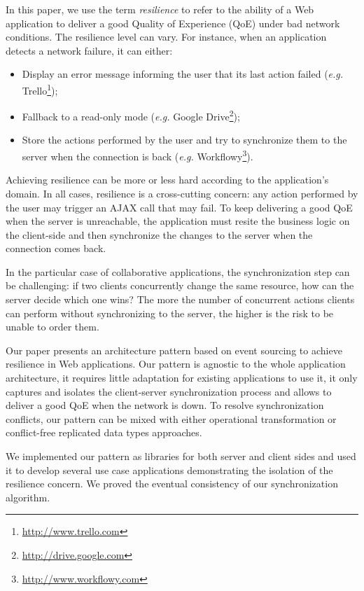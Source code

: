 \documentclass{acm_proc_article-sp}
\begin{document}
In this paper, we use the term \textit{resilience} to refer to the ability of a Web application to deliver a good Quality of Experience (QoE) under bad network conditions. The resilience level can vary. For instance, when an application detects a network failure, it can either:

\begin{itemize}
 \item Display an error message informing the user that its last action failed (\textit{e.g.} Trello\footnote{\href{http://www.trello.com}{http://www.trello.com}});
 \item Fallback to a read-only mode (\textit{e.g.} Google Drive\footnote{\href{http://drive.google.com}{http://drive.google.com}});
 \item Store the actions performed by the user and try to synchronize them to the server when the connection is back (\textit{e.g.} Workflowy\footnote{\href{http://www.workflowy.com}{http://www.workflowy.com}}).
\end{itemize}

Achieving resilience can be more or less hard according to the application’s domain. In all cases, resilience is a cross-cutting concern: any action performed by the user may trigger an AJAX call that may fail. To keep delivering a good QoE when the server is unreachable, the application must resite the business logic on the client-side and then synchronize the changes to the server when the connection comes back.

In the particular case of collaborative applications, the synchronization step can be challenging: if two clients concurrently change the same resource, how can the server decide which one wins? The more the number of concurrent actions clients can perform without synchronizing to the server, the higher is the risk to be unable to order them.

Our paper presents an architecture pattern based on event sourcing to achieve resilience in Web applications. Our pattern is agnostic to the whole application architecture, it requires little adaptation for existing applications to use it, it only captures and isolates the client-server synchronization process and allows to deliver a good QoE when the network is down. To resolve synchronization conflicts, our pattern can be mixed with either operational transformation or conflict-free replicated data types approaches.

We implemented our pattern as libraries for both server and client sides and used it to develop several use case applications demonstrating the isolation of the resilience concern. We proved the eventual consistency of our synchronization algorithm.
\end{document}
